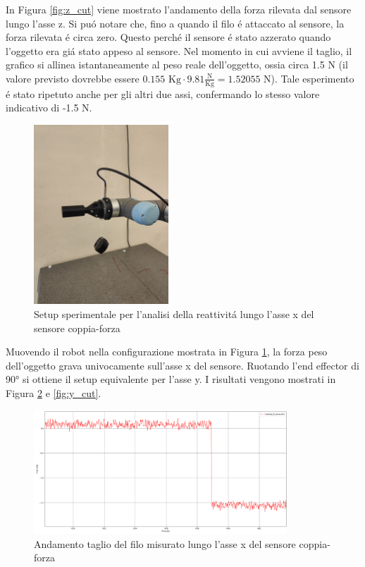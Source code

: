 In Figura \ref{fig:z_cut} viene mostrato l'andamento della forza rilevata dal sensore lungo l'asse z. 
Si pu\'{o} notare che, fino a quando il filo \'{e} attaccato al sensore, la forza rilevata \'{e} circa zero. 
Questo perch\'{e} il sensore \'{e} stato azzerato quando l'oggetto era gi\'{a} stato appeso al sensore. 
Nel momento in cui avviene il taglio, il grafico si allinea istantaneamente al peso reale dell'oggetto, 
ossia circa 1.5 N (il valore previsto dovrebbe essere $0.155 \text{ Kg} \cdot 9.81 \frac{\text{N}}{\text{Kg}} = 1.52055 \text{ N}$).
Tale esperimento \'{e} stato ripetuto anche per gli altri due assi, confermando lo stesso valore indicativo di -1.5 N.
\begin{figure}[H]
    \centering
    \includegraphics*[width=0.45\textwidth]{images/setup_x.jpg}
    \caption{Setup sperimentale per l'analisi della reattivit\'{a} lungo l'asse x del sensore coppia-forza}
    \label{fig:setup_x}
\end{figure}
Muovendo il robot nella configurazione mostrata in Figura \ref{fig:setup_x}, la forza peso dell'oggetto grava univocamente sull'asse x 
del sensore. 
Ruotando l'end effector di 90° si ottiene il setup equivalente per l'asse y.
I risultati vengono mostrati in Figura \ref{fig:x_cut} e \ref{fig:y_cut}. 
\begin{figure}[H]
    \centering
    \includegraphics*[width=0.85\textwidth]{images/x_cut.png}
    \caption{Andamento taglio del filo misurato lungo l'asse x del sensore coppia-forza}
    \label{fig:x_cut}
\end{figure}
